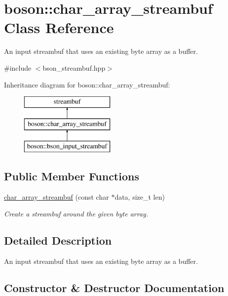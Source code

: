 \hypertarget{classboson_1_1char__array__streambuf}{}\section{boson\+:\+:char\+\_\+array\+\_\+streambuf Class Reference}
\label{classboson_1_1char__array__streambuf}


An input streambuf that uses an existing byte array as a buffer.  




{\ttfamily \#include $<$bson\+\_\+streambuf.\+hpp$>$}

Inheritance diagram for boson\+:\+:char\+\_\+array\+\_\+streambuf\+:\begin{figure}[H]
\begin{center}
\leavevmode
\includegraphics[height=3.000000cm]{classboson_1_1char__array__streambuf}
\end{center}
\end{figure}
\subsection*{Public Member Functions}
\begin{DoxyCompactItemize}
\item 
\hyperlink{classboson_1_1char__array__streambuf_a6d1a17014adfe5daa6c9586f877c6a46}{char\+\_\+array\+\_\+streambuf} (const char $\ast$data, size\+\_\+t len)
\begin{DoxyCompactList}\small\item\em Create a streambuf around the given byte array. \end{DoxyCompactList}\end{DoxyCompactItemize}


\subsection{Detailed Description}
An input streambuf that uses an existing byte array as a buffer. 

\subsection{Constructor \& Destructor Documentation}
